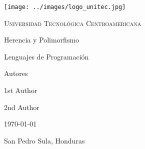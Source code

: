 \documentclass{article}
\begin{document}
	\begin{titlepage}
		\centering
		\texttt{[image: ../images/logo\_unitec.jpg]}\par
		\scshape\LARGE Universidad Tecnol\'ogica Centroamericana \par
		\vfill
		\Huge Herencia y Polimorfismo \par
		\vfill
		\LARGE Lenguajes de Programaci\'on \par
		\vfill
		\large Autores \par
		\Large 1st Author  \par
		\Large  2nd Author \par
		\vfill
		\Large \today \par
		\vfill
		\large San Pedro Sula, Honduras \par
		\vfill
	\end{titlepage}
\end{document}
